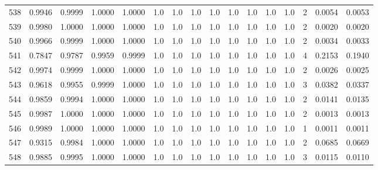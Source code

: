 \begin{tabular}{lrrrrrrrrrrrrrrr}
538 &      0.9946 &  0.9999 &  1.0000 &  1.0000 &     1.0 &     1.0 &     1.0 &     1.0 &     1.0 &     1.0 &      1.0 &        1.0 &      2 &                    0.0054 &                     0.0053 \\
539 &      0.9980 &  1.0000 &  1.0000 &  1.0000 &     1.0 &     1.0 &     1.0 &     1.0 &     1.0 &     1.0 &      1.0 &        1.0 &      2 &                    0.0020 &                     0.0020 \\
540 &      0.9966 &  0.9999 &  1.0000 &  1.0000 &     1.0 &     1.0 &     1.0 &     1.0 &     1.0 &     1.0 &      1.0 &        1.0 &      2 &                    0.0034 &                     0.0033 \\
541 &      0.7847 &  0.9787 &  0.9959 &  0.9999 &     1.0 &     1.0 &     1.0 &     1.0 &     1.0 &     1.0 &      1.0 &        1.0 &      4 &                    0.2153 &                     0.1940 \\
542 &      0.9974 &  0.9999 &  1.0000 &  1.0000 &     1.0 &     1.0 &     1.0 &     1.0 &     1.0 &     1.0 &      1.0 &        1.0 &      2 &                    0.0026 &                     0.0025 \\
543 &      0.9618 &  0.9955 &  0.9999 &  1.0000 &     1.0 &     1.0 &     1.0 &     1.0 &     1.0 &     1.0 &      1.0 &        1.0 &      3 &                    0.0382 &                     0.0337 \\
544 &      0.9859 &  0.9994 &  1.0000 &  1.0000 &     1.0 &     1.0 &     1.0 &     1.0 &     1.0 &     1.0 &      1.0 &        1.0 &      2 &                    0.0141 &                     0.0135 \\
545 &      0.9987 &  1.0000 &  1.0000 &  1.0000 &     1.0 &     1.0 &     1.0 &     1.0 &     1.0 &     1.0 &      1.0 &        1.0 &      2 &                    0.0013 &                     0.0013 \\
546 &      0.9989 &  1.0000 &  1.0000 &  1.0000 &     1.0 &     1.0 &     1.0 &     1.0 &     1.0 &     1.0 &      1.0 &        1.0 &      1 &                    0.0011 &                     0.0011 \\
547 &      0.9315 &  0.9984 &  1.0000 &  1.0000 &     1.0 &     1.0 &     1.0 &     1.0 &     1.0 &     1.0 &      1.0 &        1.0 &      2 &                    0.0685 &                     0.0669 \\
548 &      0.9885 &  0.9995 &  1.0000 &  1.0000 &     1.0 &     1.0 &     1.0 &     1.0 &     1.0 &     1.0 &      1.0 &        1.0 &      3 &                    0.0115 &                     0.0110 \\

\end{tabular}
